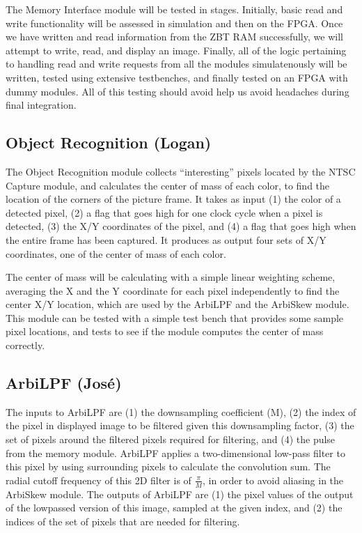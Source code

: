 \documentclass[10pt]{article}
\begin{document}
The Memory Interface module will be tested in stages. Initially, basic read and write functionality will be assessed in simulation and then on the FPGA. Once we have written and read information from the ZBT RAM successfully, we will attempt to write, read, and display an image. Finally, all of the logic pertaining to handling read and write requests from all the modules simulatenously will be written, tested using extensive testbenches, and finally tested on an FPGA with dummy modules. All of this testing should avoid help us avoid headaches during final integration.

\subsection{Object Recognition (Logan)}
The Object Recognition module collects ``interesting'' pixels located by the NTSC Capture module, and calculates the center of mass of each color, to find the location of the corners of the picture frame. It takes as input (1) the color of a detected pixel, (2) a flag that goes high for one clock cycle when a pixel is detected, (3) the X/Y coordinates of the pixel, and (4) a flag that goes high when the entire frame has been captured. It produces as output four sets of X/Y coordinates, one of the center of mass of each color.

The center of mass will be calculating with a simple linear weighting scheme, averaging the X and the Y coordinate for each pixel independently to find the center X/Y location, which are used by the ArbiLPF and the ArbiSkew module. This module can be tested with a simple test bench that provides some sample pixel locations, and tests to see if the module computes the center of mass correctly.

\subsection{ArbiLPF (Jos\'{e})}
The inputs to ArbiLPF are (1) the downsampling coefficient (M), (2) the index of the pixel in displayed image to be filtered given this downsampling factor, (3) the set of pixels around the filtered pixels required for filtering, and (4) the pulse from the memory module. ArbiLPF applies a two-dimensional low-pass filter to this pixel by using surrounding pixels to calculate the convolution sum. The radial cutoff frequency of this 2D filter is of \( \frac{\pi}{M} \), in order to avoid aliasing in the ArbiSkew module. The outputs of ArbiLPF are (1) the pixel values of the output of the lowpassed version of this image, sampled at the given index, and (2) the indices of the set of pixels that are needed for filtering.
\end{document}
